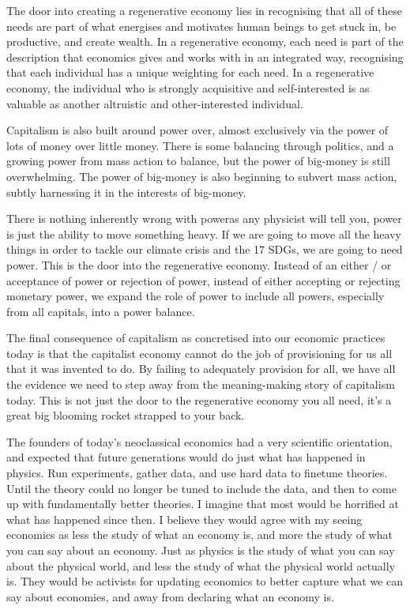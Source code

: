 The door into creating a regenerative economy lies in recognising that all of these needs are part of what energises and motivates human beings to get stuck in, be productive, and create wealth. In a regenerative economy, each need is part of the description that economics gives and works with in an integrated way, recognising that each individual has a unique weighting for each need. In a regenerative economy, the individual who is strongly acquisitive and self-interested is as valuable as another altruistic and other-interested individual.


Capitalism is also built around power over, almost exclusively via the power of lots of money over little money. There is some balancing through politics, and a growing power from mass action to balance, but the power of big-money is still overwhelming. The power of big-money is also beginning to subvert mass action, subtly harnessing it in the interests of big-money.


There is nothing inherently wrong with power\textemdash as any physicist will tell you, power is just the ability to move something heavy. If we are going to move all the heavy things in order to tackle our climate crisis and the 17 SDGs, we are going to need power. This is the door into the regenerative economy. Instead of an either / or acceptance of power or rejection of power, instead of either accepting or rejecting monetary power, we expand the role of power to include all powers, especially from all capitals, into a power balance.


The final consequence of capitalism as concretised into our economic practices today is that the capitalist economy cannot do the job of provisioning for us all that it was invented to do. By failing to adequately provision for all, we have all the evidence we need to step away from the meaning\hyp{}making story of capitalism today. This is not just the door to the regenerative economy you all need, it's a great big blooming rocket strapped to your back.


The founders of today's neoclassical economics had a very scientific orientation, and expected that future generations would do just what has happened in physics. Run experiments, gather data, and use hard data to finetune theories. Until the theory could no longer be tuned to include the data, and then to come up with fundamentally better theories. I imagine that most would be horrified at what has happened since then. I believe they would agree with my seeing economics as less the study of what an economy is, and more the study of what you can say about an economy. Just as physics is the study of what you can say about the physical world, and less the study of what the physical world actually is. They would be activists for updating economics to better capture what we can say about economies, and away from declaring what an economy is.


